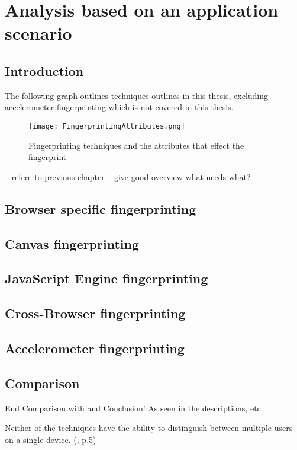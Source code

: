 \chapter{Analysis based on an application scenario}
\label{cha:ApplicationScenario}

\section{Introduction}

The following graph outlines techniques outlines in this thesis, excluding accelerometer fingerprinting which is not covered in this thesis.

\begin{figure}[H]
	\centering
	\texttt{[image: FingerprintingAttributes.png]}
	\caption{Fingerprinting techniques and the attributes that effect the fingerprint}
	\label{BrowserSpecification}
\end{figure}

-- refere to previous chapter
-- give good overview what needs what?

\section{Browser specific fingerprinting}
\section{Canvas fingerprinting}
\section{JavaScript Engine fingerprinting}
\section{Cross-Browser fingerprinting}
\section{Accelerometer fingerprinting}

\section{Comparison}
End Comparison with and Conclusion!
As seen in the descriptions, etc.

Neither of the techniques have the ability to distinguish between multiple users on a single device.  (\textcite{upi15}, p.5)

